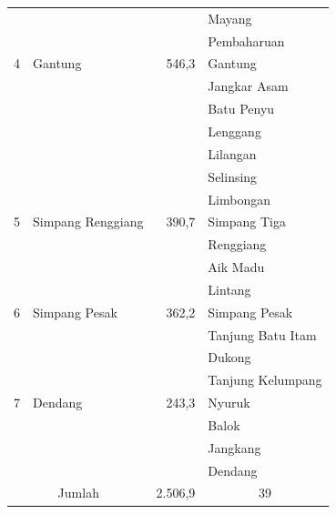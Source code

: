\begin{longtable}[H]{rlrl}
                   &                   &         & Mayang                 \\
                   &                   &         & Pembaharuan            \\ \midrule
                 4 & Gantung           &   546,3 & Gantung                \\
                   &                   &         & Jangkar Asam           \\
                   &                   &         & Batu Penyu             \\
                   &                   &         & Lenggang               \\
                   &                   &         & Lilangan               \\
                   &                   &         & Selinsing              \\
                   &                   &         & Limbongan              \\ \midrule
                 5 & Simpang Renggiang &   390,7 & Simpang Tiga           \\
                   &                   &         & Renggiang              \\
                   &                   &         & Aik Madu               \\
                   &                   &         & Lintang                \\ \midrule
                 6 & Simpang Pesak     &   362,2 & Simpang Pesak          \\
                   &                   &         & Tanjung Batu Itam      \\
                   &                   &         & Dukong                 \\
                   &                   &         & Tanjung Kelumpang      \\ \midrule
                 7 & Dendang           &   243,3 & Nyuruk                 \\
                   &                   &         & Balok                  \\
                   &                   &         & Jangkang               \\
                   &                   &         & Dendang                \\ \midrule
\multicolumn{2}{c}{Jumlah}             & 2.506,9 & \multicolumn{1}{c}{39}\\ %
\bottomrule
\end{longtable}


